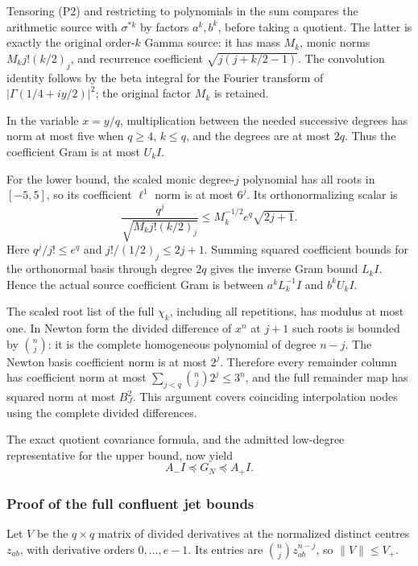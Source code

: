 Tensoring (P2) and restricting to polynomials in the sum compares the arithmetic source with \(\sigma^{*k}\) by factors \(a^k,b^k\), before taking a quotient. The latter is exactly the original order-\(k\) Gamma source: it has mass \(M_k\), monic norms \(M_k j!(k/2)_j\), and recurrence coefficient \(\sqrt{j(j+k/2-1)}\). The convolution identity follows by the beta integral for the Fourier transform of \(|\Gamma(1/4+iy/2)|^2\); the original factor \(M_k\) is retained.

In the variable \(x=y/q\), multiplication between the needed successive degrees has norm at most five when \(q\ge4\), \(k\le q\), and the degrees are at most \(2q\). Thus the coefficient Gram is at most \(U_kI\).

For the lower bound, the scaled monic degree-\(j\) polynomial has all roots in \([-5,5]\), so its coefficient \(\ell^1\) norm is at most \(6^j\). Its orthonormalizing scalar is \[
 \frac{q^j}{\sqrt{M_kj!(k/2)_j}}
 \le M_k^{-1/2}e^q\sqrt{2j+1}.
\] Here \(q^j/j!\le e^q\) and \(j!/(1/2)_j\le2j+1\). Summing squared coefficient bounds for the orthonormal basis through degree \(2q\) gives the inverse Gram bound \(L_kI\). Hence the actual source coefficient Gram is between \(a^kL_k^{-1}I\) and \(b^kU_kI\).

The scaled root list of the full \(\chi_k\), including all repetitions, has modulus at most one. In Newton form the divided difference of \(x^n\) at \(j+1\) such roots is bounded by \(\binom nj\): it is the complete homogeneous polynomial of degree \(n-j\). The Newton basis coefficient norm is at most \(2^j\). Therefore every remainder column has coefficient norm at most \(\sum_{j<q}\binom nj2^j\le3^n\), and the full remainder map has squared norm at most \(B_J^2\). This argument covers coinciding interpolation nodes using the complete divided differences.

The exact quotient covariance formula, and the admitted low-degree representative for the upper bound, now yield \[
 A_-I\preceq G_N\preceq A_+I. \tag{S6}
\]

\subsubsection{Proof of the full confluent jet bounds}\label{proof-of-the-full-confluent-jet-bounds}

Let \(V\) be the \(q\times q\) matrix of divided derivatives at the normalized distinct centres \(z_{ab}\), with derivative orders \(0,\ldots,e-1\). Its entries are \(\binom njz_{ab}^{n-j}\), so \(\|V\|\le V_+\).

